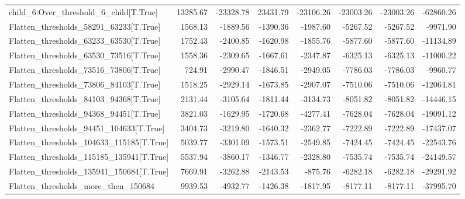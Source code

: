 \begin{subappendices}
\begin{table}[H]
{\begin{tabular}{lrrrrrrr}
child\_6:Over\_threshold\_6\_child[T.True]    &   13285.67 &  -23328.78 &   23431.79 &  -23106.26 &                -23003.26 &  -23003.26 &             -62860.26 \\
Flatten\_thresholds\_58291\_63233[T.True]    &    1568.13 &   -1889.56 &   -1390.36 &   -1987.60 &                 -5267.52 &   -5267.52 &              -9971.90 \\
Flatten\_thresholds\_63233\_63530[T.True]    &    1752.43 &   -2400.85 &   -1620.98 &   -1855.76 &                 -5877.60 &   -5877.60 &             -11134.89 \\
Flatten\_thresholds\_63530\_73516[T.True]    &    1558.36 &   -2309.65 &   -1667.61 &   -2347.87 &                 -6325.13 &   -6325.13 &             -11000.22 \\
Flatten\_thresholds\_73516\_73806[T.True]    &     724.91 &   -2990.47 &   -1846.51 &   -2949.05 &                 -7786.03 &   -7786.03 &              -9960.77 \\
Flatten\_thresholds\_73806\_84103[T.True]    &    1518.25 &   -2929.14 &   -1673.85 &   -2907.07 &                 -7510.06 &   -7510.06 &             -12064.81 \\
Flatten\_thresholds\_84103\_94368[T.True]    &    2131.44 &   -3105.64 &   -1811.44 &   -3134.73 &                 -8051.82 &   -8051.82 &             -14446.15 \\
Flatten\_thresholds\_94368\_94451[T.True]    &    3821.03 &   -1629.95 &   -1720.68 &   -4277.41 &                 -7628.04 &   -7628.04 &             -19091.12 \\
Flatten\_thresholds\_94451\_104633[T.True]   &    3404.73 &   -3219.80 &   -1640.32 &   -2362.77 &                 -7222.89 &   -7222.89 &             -17437.07 \\
Flatten\_thresholds\_104633\_115185[T.True]  &    5039.77 &   -3301.09 &   -1573.51 &   -2549.85 &                 -7424.45 &   -7424.45 &             -22543.76 \\
Flatten\_thresholds\_115185\_135941[T.True]  &    5537.94 &   -3860.17 &   -1346.77 &   -2328.80 &                 -7535.74 &   -7535.74 &             -24149.57 \\
Flatten\_thresholds\_135941\_150684[T.True]  &    7669.91 &   -3262.88 &   -2143.53 &    -875.76 &                 -6282.18 &   -6282.18 &             -29291.92 \\
Flatten\_thresholds\_more\_then\_150684       &    9939.53 &   -4932.77 &   -1426.38 &   -1817.95 &                 -8177.11 &   -8177.11 &             -37995.70 \\

\end{tabular}}
\end{table}
\end{subappendices}
